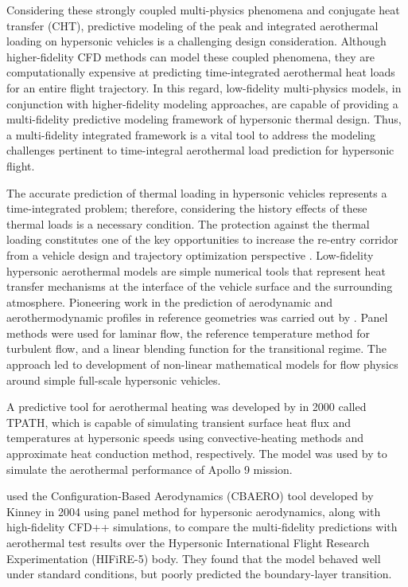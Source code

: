 \documentclass[%
 aip,
 amsmath,amssymb,
preprint,%
]{revtex4-1}
\begin{document}

Considering these strongly coupled multi-physics phenomena and conjugate heat transfer (CHT), predictive modeling of the peak and integrated aerothermal loading on hypersonic vehicles is a challenging design consideration.
Although higher-fidelity CFD methods can model these coupled phenomena, they are computationally expensive at predicting time-integrated aerothermal heat loads for an entire flight trajectory. In this regard, low-fidelity multi-physics models, in conjunction with higher-fidelity modeling approaches, are capable of providing a multi-fidelity predictive modeling framework of hypersonic thermal design. Thus, a multi-fidelity integrated framework is a vital tool to address the modeling challenges pertinent to time-integral aerothermal load prediction for hypersonic flight.


The accurate prediction of thermal loading in hypersonic vehicles represents a time-integrated problem; therefore, considering the history effects of these thermal loads is a necessary condition. The protection against the thermal loading constitutes one of the key opportunities to increase the re-entry corridor from a vehicle design and trajectory optimization perspective \cite{karl_sustainable_2024}. Low-fidelity hypersonic aerothermal models are simple numerical tools that represent heat transfer mechanisms at the interface of the vehicle surface and the surrounding atmosphere. Pioneering work in the prediction of aerodynamic and aerothermodynamic profiles in reference geometries was carried out by \citet{tauber_review_1989}. Panel methods were used for laminar flow, the reference temperature method for turbulent flow, and a linear blending function for the transitional regime. The approach led to development of non-linear mathematical models for flow physics around simple full-scale hypersonic vehicles. 

A predictive tool for aerothermal heating was developed by \citet{Quinn_2000} in 2000 called TPATH, which is capable of simulating transient surface heat flux and temperatures at hypersonic speeds using convective-heating methods and approximate heat conduction method, respectively. The model was used by \citet{Ko_Gong_Quinn_2007} to simulate the aerothermal performance of Apollo 9 mission.

\citet{Paxton_Villasenor_Gallagher_Chun_2020} used the Configuration-Based Aerodynamics (CBAERO) tool developed by Kinney in 2004 using panel method for hypersonic aerodynamics, along with high-fidelity CFD++ simulations, to compare the multi-fidelity predictions with aerothermal test results over the Hypersonic International Flight Research Experimentation (HIFiRE-5) body. They found that the model behaved well under standard conditions, but poorly predicted the boundary-layer transition.
\end{document}

